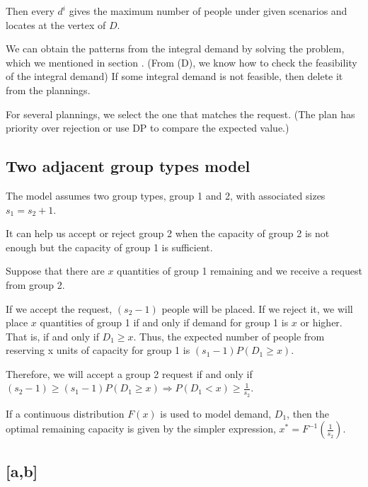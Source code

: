 Then every $d^{i}$ gives the maximum number of people under given scenarios and locates at the vertex of $D$.


We can obtain the patterns from the integral demand by
solving the problem, which we mentioned in section . (From (D), we know how to check the feasibility of the integral demand) If some integral demand is not feasible, then delete it from the plannings.

For several plannings, we select the one that matches the request. (The plan has priority over rejection or use DP to compare the expected value.) 



\subsection{Two adjacent group types model}\label{sec_adjacent}
The model assumes two group types, group 1 and 2, with associated sizes $s_1 = s_2 + 1$.

It can help us accept or reject group 2 when the capacity of group 2 is not enough but the capacity of group 1 is sufficient.

Suppose that there are $x$ quantities of group 1 remaining and we receive a request from group 2.

If we accept the request, $(s_2 -1)$ people will be placed. If we reject it, we will place $x$ quantities of group 1 if and only if demand for group 1 is $x$ or higher. That is, if and only if $D_1 \geq x$. Thus, the expected number of people from reserving x units of capacity for group 1 is $(s_1-1)P(D_1 \geq x)$.

Therefore, we will accept a group 2 request if and only if $(s_{2}-1) \geq (s_{1}-1) P\left(D_{1} \geq x\right)
\Rightarrow P(D_1 < x) \geq \frac{1}{s_2}$.

If a continuous distribution $F(x)$ is used to model demand, $D_1$, then the optimal remaining capacity is given by the simpler expression, $x^{*} = F^{-1}(\frac{1}{s_2})$.

\subsection{[a,b]}

